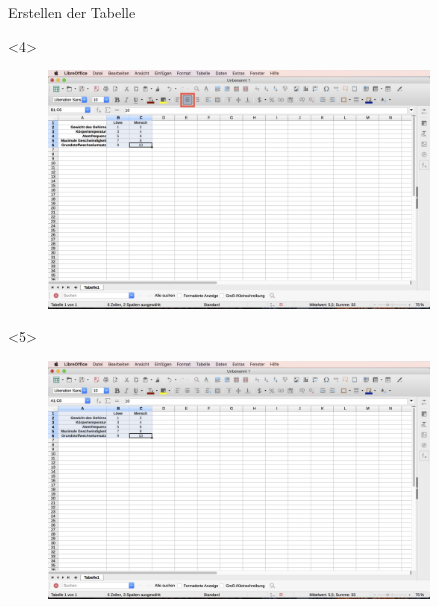\begin{frame}[c]{Erstellen der Tabelle}
\begin{onlyenv}
\begin{figure}[htbp]
		\end{figure}
	\end{onlyenv}
	\begin{onlyenv}
		\begin{figure}[htbp]
			\centering
			\includegraphics[width=0.9\textwidth]{img/Bildschirmfoto_mitKasten/3_Tabelle/4.jpg}
		\end{figure}
	\end{onlyenv}
	\begin{onlyenv}
		\begin{figure}[htbp]
			\centering
			\includegraphics[width=0.9\textwidth]{img/Bildschirmfoto_mitKasten/3_Tabelle/5.jpg}
		\end{figure}
	\end{onlyenv}
\end{frame}
